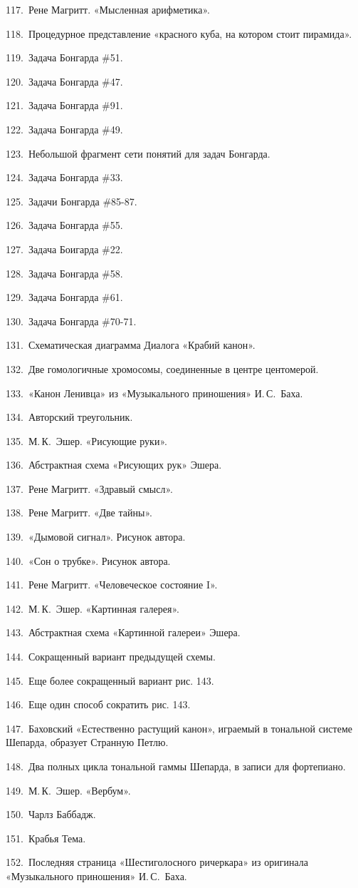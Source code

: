 \documentclass[../main.tex]{subfiles}
\begin{document}
117.~Рене Магритт. «Мысленная арифметика».

118.~Процедурное представление «красного куба, на котором стоит пирамида».

119.~Задача Бонгарда \#51.

120.~Задача Бонгарда \#47.

121.~Задача Бонгарда \#91.

122.~Задача Бонгарда \#49.

123.~Небольшой фрагмент сети понятий для задач Бонгарда.

124.~Задача Бонгарда \#33.

125.~Задачи Бонгарда \#85-87.

126.~Задача Бонгарда \#55.

127.~Задача Боигарда \#22.

128.~Задача Бонгарда \#58.

129.~Задача Бонгарда \#61.

130.~Задача Бонгарда \#70-71.

131.~Схематическая диаграмма Диалога «Крабий канон».

132.~Две гомологичные хромосомы, соединенные в центре центомерой.

133.~«Канон Ленивца» из «Музыкального приношения» И.\,С.~Баха.

134.~Авторский треугольник.

135.~М.\,К.~Эшер. «Рисующие руки».

136.~Абстрактная схема «Рисующих рук» Эшера.

137.~Рене Магритт. «Здравый смысл».

138.~Рене Магритт. «Две тайны».

139.~«Дымовой сигнал». Рисунок автора.

140.~«Сон о трубке». Рисунок автора.

141.~Рене Магритт. «Человеческое состояние I».

142.~М.\,К.~Эшер. «Картинная галерея».

143.~Абстрактная схема «Картинной галереи» Эшера.

144.~Сокращенный вариант предыдущей схемы.

145.~Еще более сокращенный вариант рис. 143.

146.~Еще один способ сократить рис. 143.

147.~Баховский «Естественно растущий канон», играемый в тональной системе Шепарда, образует Странную Петлю.

148.~Два полных цикла тональной гаммы Шепарда, в записи для фортепиано.

149.~М.\,К.~Эшер. «Вербум».

150.~Чарлз Баббадж.

151.~Крабья Тема.

152.~Последняя страница «Шестиголосного ричеркара» из оригинала «Музыкального приношения» И.\,С.~Баха.
\end{document}
